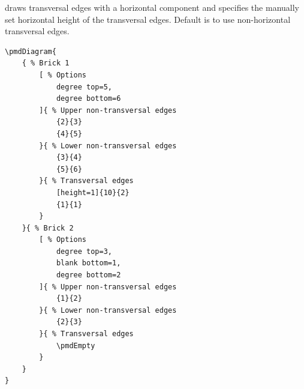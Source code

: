 \documentclass{ltxdoc}
\begin{document}
draws transversal edges with a horizontal component and specifies the manually set horizontal height of the transversal edges. Default is to use non-horizontal transversal edges.
\begin{center}
    \begin{minipage}{\dimexpr0.85\textwidth-2\fboxrule-2\fboxsep\relax}
        \begin{minipage}[c]{0.4\linewidth}
\begin{verbatim}
\pmdDiagram{
    { % Brick 1
        [ % Options
            degree top=5,
            degree bottom=6
        ]{ % Upper non-transversal edges
            {2}{3}
            {4}{5}
        }{ % Lower non-transversal edges
            {3}{4}
            {5}{6}
        }{ % Transversal edges
            [height=1]{10}{2}
            {1}{1}
        }
    }{ % Brick 2
        [ % Options
            degree top=3,
            blank bottom=1,
            degree bottom=2
        ]{ % Upper non-transversal edges
            {1}{2}
        }{ % Lower non-transversal edges
            {2}{3}
        }{ % Transversal edges
            \pmdEmpty
        }
    }
}
\end{verbatim}
        \end{minipage}
        \hfill
        \begin{minipage}[c]{0.4\linewidth}
        \end{minipage}
    \end{minipage}%
\end{center}
\begin{center}
\end{center}
\end{document}
